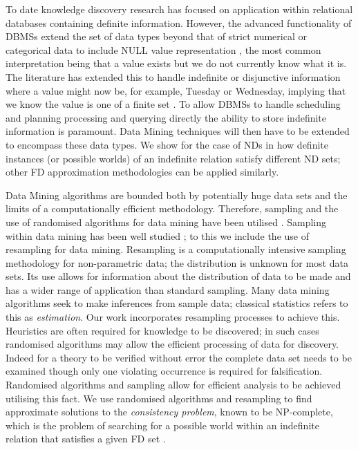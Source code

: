 \medskip

To date knowledge discovery research has focused on application
within relational databases containing definite information. However,
the advanced functionality of DBMSs extend the set of
data types beyond that of strict numerical or categorical data to
include NULL value representation \cite{lip79,il84}, the most common
interpretation being that a value
exists but we do not currently know what it is. The literature has
extended this to handle indefinite or disjunctive information where a
value might now be, for example, Tuesday or Wednesday, implying that
we know the value is one of a finite set \cite{inv91,vn95}.  To allow DBMSs to
handle scheduling 
and planning processing and querying directly the ability to store 
indefinite information is paramount. Data Mining techniques will then
have to be extended to encompass these data types. We show for the
case of NDs in \cite{cl98} how definite instances (or possible worlds)
of an indefinite relation satisfy different ND sets; other
FD approximation methodologies can be applied similarly.

\medskip
{}

Data Mining algorithms are bounded both by potentially huge data sets
and the limits of a computationally efficient methodology. Therefore,
sampling and the use of randomised algorithms for data mining have
been utilised \cite{km94,gms97,cl98b}. Sampling within data mining has
been well studied \cite{km94,jl96}; to this we include the use of
resampling for data mining. Resampling is a computationally intensive
sampling methodology for non-parametric data; the distribution is
unknown for most data sets. Its use allows for information about the
distribution of data to 
be made and has a wider range of application than standard
sampling. Many data mining algorithms seek to make inferences from
sample data; classical statistics refers to this as {\em estimation}. 
Our work incorporates resampling processes \cite{efro79,et86,et93}
to achieve this. Heuristics are often required for knowledge to be
discovered;
in such cases randomised algorithms may allow the efficient processing of
data for discovery. Indeed for a theory to be verified without error
the complete data set needs to be examined though only one violating occurrence
is required for falsification. Randomised algorithms and sampling allow for 
efficient analysis to be achieved utilising this fact. We use randomised
algorithms and resampling to find approximate solutions to the
{\em consistency problem}, known to be NP-complete, which is the problem of
searching for a possible world within an indefinite relation that
satisfies a given FD set \cite{vn95,cl98b,cl98}.

